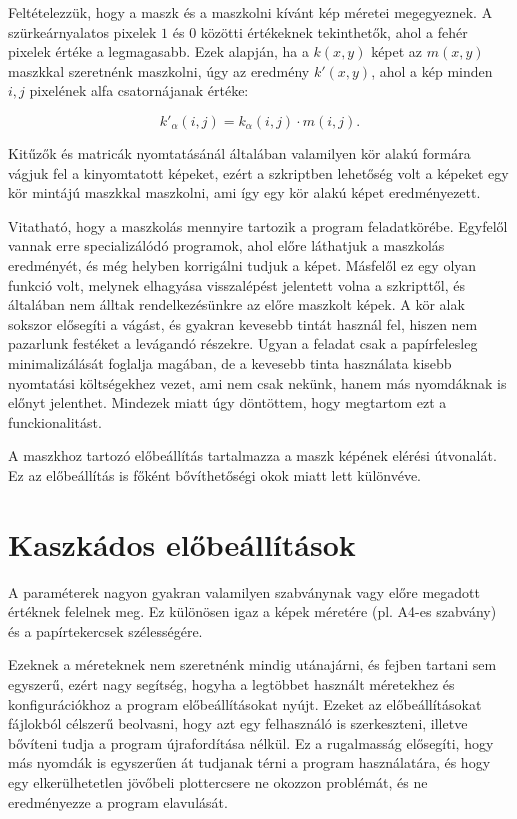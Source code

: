 Feltételezzük, hogy a maszk és a maszkolni kívánt kép méretei megegyeznek. A szürkeárnyalatos pixelek $1$ és $0$ közötti értékeknek tekinthetők, ahol a fehér pixelek értéke a legmagasabb.
Ezek alapján, ha a $k(x, y)$ képet az $m(x, y)$ maszkkal szeretnénk maszkolni, úgy az eredmény $k'(x, y)$, ahol a kép minden $i, j$ pixelének alfa csatornájanak értéke:

$$k'_\alpha(i, j) = k_\alpha(i, j) \cdot m(i, j).$$

Kitűzők és matricák nyomtatásánál általában valamilyen kör alakú formára vágjuk fel a kinyomtatott képeket, ezért a szkriptben lehetőség volt a képeket egy kör mintájú maszkkal maszkolni, ami így egy kör alakú képet eredményezett.

Vitatható, hogy a maszkolás mennyire tartozik a program feladatkörébe. Egyfelől vannak erre specializálódó programok, ahol előre láthatjuk a maszkolás eredményét, és még helyben korrigálni tudjuk a képet. Másfelől ez egy olyan funkció volt, melynek elhagyása visszalépést jelentett volna a szkripttől, és általában nem álltak rendelkezésünkre az előre maszkolt képek. 
A kör alak sokszor elősegíti a vágást, és gyakran kevesebb tintát használ fel, hiszen nem pazarlunk festéket a levágandó részekre.
Ugyan a feladat csak a papírfelesleg minimalizálását foglalja magában, de a kevesebb tinta használata kisebb nyomtatási költségekhez vezet, ami nem csak nekünk, hanem más nyomdáknak is előnyt jelenthet. Mindezek miatt úgy döntöttem, hogy megtartom ezt a funckionalitást.

A maszkhoz tartozó előbeállítás tartalmazza a maszk képének elérési útvonalát. Ez az előbeállítás is főként bővíthetőségi okok miatt lett különvéve.

\section{Kaszkádos előbeállítások}

A paraméterek nagyon gyakran valamilyen szabványnak vagy előre megadott értéknek felelnek meg. Ez különösen igaz a képek méretére (pl. A4-es szabvány) és a papírtekercsek szélességére. 

Ezeknek a méreteknek nem szeretnénk mindig utánajárni, és fejben tartani sem egyszerű, ezért nagy segítség, hogyha a legtöbbet használt méretekhez és konfigurációkhoz a program előbeállításokat nyújt. 
Ezeket az előbeállításokat fájlokból célszerű beolvasni, hogy azt egy felhasználó is szerkeszteni, illetve bővíteni tudja a program újrafordítása nélkül. Ez a rugalmasság elősegíti, hogy más nyomdák is egyszerűen át tudjanak térni a program használatára, és hogy egy elkerülhetetlen jövőbeli plottercsere ne okozzon problémát, és ne eredményezze a program elavulását.

